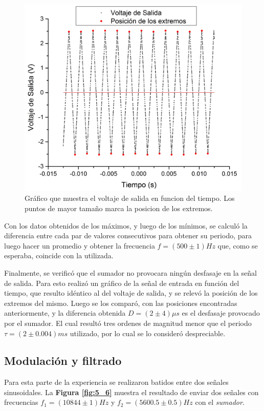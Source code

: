 \documentclass[11pt,a4paper]{article}
\begin{document}
\begin{figure}[h]
\centering
\includegraphics[scale=0.4]{Voltaje_de_Salida}
\caption{Gráfico que muestra el voltaje de salida en funcion del tiempo. Los puntos de mayor tamaño marca la posicion de los extremos.}
\label{fig:Vol_Sal}
\end{figure}

Con los datos obtenidos de los máximos, y luego de los mínimos, se calculó la diferencia entre cada par de valores consecutivos para obtener su periodo, para luego hacer un promedio y obtener la frecuencia $f= (500 \pm 1)Hz$ que, como se esperaba, coincide con la utilizada.

Finalmente, se verificó que el sumador no provocara ningún desfasaje en la señal de salida. Para esto realizó un gráfico de la señal de entrada en función del tiempo, que resulto idéntico al del voltaje de salida, y se relevó la posición de los extremos del mismo. Luego se los comparó, con las posiciones encontradas anteriormente, y la diferencia obtenida $D= (2 \pm4)\mu s$ es el desfasaje provocado por el sumador. El cual resultó tres ordenes de magnitud menor que el periodo $\tau = (2 \pm 0.004)ms$ utilizado, por lo cual se lo consideró despreciable.


\subsection{Modulación y filtrado}

Para esta parte de la experiencia se realizaron batidos entre dos señales sinusoidales. La \textbf{Figura \ref{fig:5_6}} muestra el resultado de enviar dos señales con frecuencias $f_1=(10844 \pm 1)Hz$ y $f_2=(5600.5 \pm 0.5)Hz$ con el \textit{sumador}.
\end{document}
